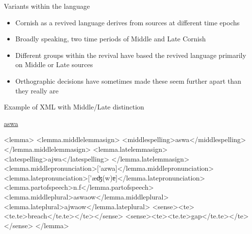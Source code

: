 \documentclass{beamer}
\begin{document}
\begin{frame}{Variants within the language}
\begin{itemize}
\item<1-> Cornish as a revived language derives from sources at different time epochs
\item<2-> Broadly speaking, two time periods of Middle and Late Cornish
\item<3-> Different groups within the revival have based the revived language primarily on Middle or Late sources
\item<4-> Orthographic decisions have sometimes made these seem further apart than they really are
\end{itemize}
\end{frame}
\begin{frame}[fragile]{Example of XML with Middle/Late distinction}
\begin{scriptsize}
\href{http://www.cornishdictionary.org.uk/?locale=en#aswa}{aswa}
\begin{semiverbatim}
\color{gray}
<lemma>
<lemma.middlelemmasign>
<middlespelling>{\color{black}aswa}</middlespelling>
</lemma.middlelemmasign>
<lemma.latelemmasign>
<latespelling>{\color{black}ajwa}</latespelling>
</lemma.latelemmasign>
<lemma.middlepronunciation>['azwa]</lemma.middlepronunciation>
<lemma.latepronunciation>['æʤ(w)ɐ]</lemma.latepronunciation>
<lemma.partofspeech>{\color{black}n.f}</lemma.partofspeech>
<lemma.middleplural>{\color{black}aswaow}</lemma.middleplural>
<lemma.lateplural>{\color{black}ajwaow}</lemma.lateplural>
<sense><te><te.te>{\color{black}breach}</te.te></te></sense>
<sense><te><te.te>{\color{black}gap}</te.te></te></sense>
</lemma>
\end{semiverbatim}
\end{scriptsize}
\end{frame}
\end{document}
